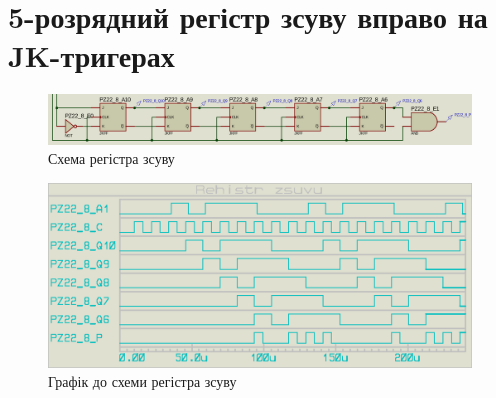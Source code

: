 \documentclass{article}
\begin{document}
\begin{normalsize}
	\begin{figure}[H]
		\centering
		\hspace{5px}
	\end{figure}

	\section*{5-розрядний регістр зсуву вправо на JK-тригерах}	
	\begin{figure}[H]
		\centering
		\includegraphics[scale=0.25]{s2}	
		\caption{Схема регістра зсуву}
	\end{figure}
	
	\begin{figure}[H]
		\centering
		\includegraphics[scale=0.25]{g2}	
		\caption{Графік до схеми регістра зсуву}
	\end{figure}


\end{normalsize}
\end{document}
